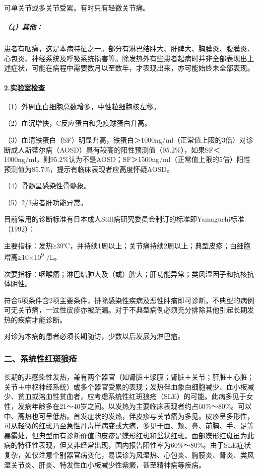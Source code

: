 可单关节或多关节受累。有时只有轻微关节痛。

\subparagraph{（4）其他：}

患者有咽痛，这是本病特征之一。部分有淋巴结肿大、肝脾大、胸膜炎、腹膜炎、心包炎、神经系统及呼吸系统损害等。除发热外有些患者起病时并非全部表现出上述症状，可能在病程中需要数月以至数年，才表现出来，亦可能始终未全部表现。

\paragraph{2.实验室检查}

（1）外周血白细胞总数增多，中性粒细胞核左移。

（2）血沉增快，C反应蛋白和免疫球蛋白升高。

（3）血清铁蛋白（SF）明显升高，铁蛋白＞1000ng/ml（正常值上限的3倍）对诊断成人斯蒂尔病（AOSD）具有较高的阳性预测值（95.2\%），如果SF＜1000ng/ml，则95.2\%认为不是AOSD；SF＞1500ng/ml（正常值上限的5倍）阳性预测值为85.7\%，提示有临床表现者应高度怀疑AOSD。

（4）骨髓呈感染性骨髓象。

（5）2/3患者肝功能异常。

目前常用的诊断标准有日本成人Still病研究委员会制订的标准即Yamaguchi标准（1992）：

主要指标：发热≥39℃，并持续1周以上；关节痛持续2周以上；典型皮疹；白细胞增高≥10×10\textsuperscript{9}
/L。

次要指标：咽喉痛；淋巴结肿大及（或）脾大；肝功能异常；类风湿因子和抗核抗体阴性。

符合5项条件含2项主要条件，排除感染性疾病及恶性肿瘤即可诊断。不典型的病例可无关节痛，一过性皮疹亦被疏漏。对于不典型病例必须充分排除其他引起长期发热的疾病才能诊断。

对诊为本病的患者必须长期随访，少数以后发展为淋巴瘤。

\subsubsection{二、系统性红斑狼疮}

长期的非感染性发热，兼有两个器官（如肾脏＋浆膜；肾脏＋关节；肝脏＋心脏；关节＋中枢神经系统）或多个器官受累的表现；发热伴血象白细胞减少、血小板减少、贫血或溶血性贫血者，应考虑系统性红斑狼疮（SLE）的可能。此病多见于女性，发病年龄多在21～40岁之间。以发热为主要临床表现者约占60\%～80\%。可以中、高热也可呈低热。首发症状的发热，伴皮疹与关节痛为多见。皮疹呈多形性，可从轻微的红斑乃至急性丹毒样病变或大疱，多见于面、颊、鼻、前胸、手、足等暴露处，但典型而有诊断价值的皮疹是蝶形红斑和盆状红斑。面部蝶形红斑虽为此病的特征性表现，但又非经常出现，国内报告阳性率为60\%～80\%。由于SLE症状复杂，如仅注意个别器官病变化，易误诊为风湿热、心包炎、胸膜炎、肾炎、类风湿关节炎、肝炎、特发性血小板减少性紫癜，甚至精神病等疾病。

